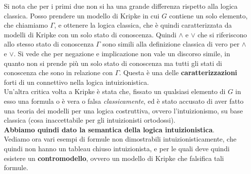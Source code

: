 \documentclass[a4paper,12pt, oneside]{book}
\begin{document}
Si nota che per i primi due non si ha una grande differenza rispetto alla logica
classica. Posso prendere un modello di Kripke in cui $G$ contiene un solo
elemento, che chiamiamo $\Gamma$, e ottenere la logica classica, che è quindi
caratterizzata da modelli di Kripke con un solo stato di conoscenza. Quindi
$\land$ e $\lor$ che si riferiscono allo stesso stato di conoscenza $\Gamma$
sono simili alla definizione classica di vero per $\land$ e $\lor$. Si vede che
per negazione e implicazione non vale un discorso simile, in quanto non si
prende più un solo stato di conoscenza ma tutti gli stati di conoscenza che sono
in 
relazione con $\Gamma$. Questa è una delle \textbf{caratterizzazioni} forti di
un connettivo nella logica intuizionistica.\\
Un'altra critica volta a Kripke è stata che, fissato un qualsiasi elemento di
$G$ in esso una formula o è vera o falsa \textit{classicamente}, ed è stato
accusato di aver fatto una teoria dei modelli per una logica costruttiva, ovvero
l'intuizionismo, su base classica (cosa inaccettabile per gli intuizionisti
ortodossi). \\
\textbf{Abbiamo quindi dato la semantica della logica intuizionistica}.\\
Vediamo ora vari esempi di formule non dimostrabili intuizionisticamente, che
quindi non hanno un tableau chiuso intuizionista, e per le quali deve quindi
esistere un \textbf{contromodello}, ovvero un modello di Kripke che falsifica
tali formule.
\end{document}

